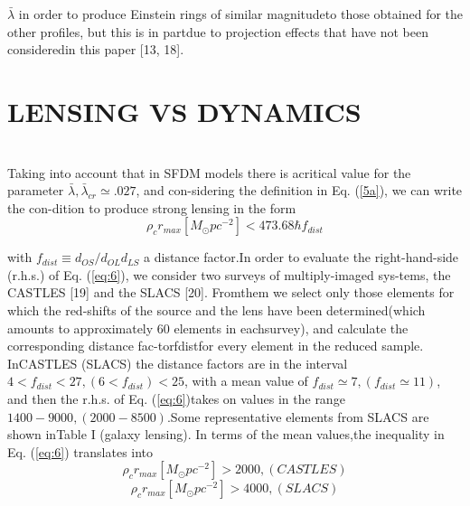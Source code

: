\documentclass[10pt]{article}
\begin{document}
\begin{multicols}{2}
\(\bar{\lambda}\) in order to produce Einstein rings of similar magnitudeto those obtained for the other profiles, but this is in partdue to projection effects that have not been consideredin this paper [13, 18].

\section{\large \centering LENSING VS DYNAMICS}\\

Taking into account that in SFDM models there is acritical value for the parameter \(\bar{\lambda} , \bar{\lambda}_{cr} \simeq .027\), and con-sidering the definition in Eq. (\ref{5a}), we can write the con-dition to produce strong lensing in the form \\
\begin{equation}\label{eq:6}
	\rho_{c} r_{max}[M_{\odot}pc^{-2}]  < 473.68 \hbar f_{dist}
\end{equation}

with \(f_{dist}\equiv d_{OS}/d_{OL}d_{LS}\) a distance factor.In  order  to  evaluate  the  right-hand-side  (r.h.s.)    of Eq. (\ref{eq:6}), we consider two surveys of multiply-imaged sys-tems,  the  CASTLES  [19]  and  the  SLACS  [20].   Fromthem  we  select  only  those  elements  for  which  the  red-shifts  of  the  source  and  the  lens  have  been  determined(which  amounts  to  approximately  60  elements  in  eachsurvey),  and  calculate  the  corresponding  distance  fac-torfdistfor  every  element  in  the  reduced  sample.   InCASTLES (SLACS) the distance factors are in the interval  \(4<f_{dist}<27, (6<f_{dist})<25\), with a mean value of \(f_{dist}\simeq 7, (f_{dist}\simeq 11)\), and then the r.h.s.  of Eq. (\ref{eq:6})takes on values in the range \(1400-9000, (2000-8500)\).Some representative elements from SLACS are shown inTable  I  (galaxy  lensing).   In  terms  of  the  mean  values,the inequality in Eq. (\ref{eq:6}) translates into
 \begin{equation}\label{eq:7a}
 	\rho_{c}r_{max}[M_{\odot}pc^{-2}]>2000, (CASTLES)
 \end{equation}
  \begin{equation}\label{7b}
 	\rho_{c}r_{max}[M_{\odot}pc^{-2}]>4000, (SLACS)
 \end{equation}
 

\end{multicols}
\end{document}
